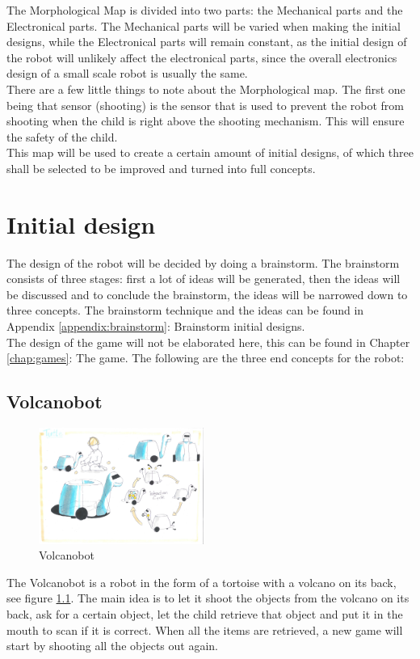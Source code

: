 \documentclass[11pt,twoside,a4paper]{report}
\begin{document}
The Morphological Map is divided into two parts: the Mechanical parts and the Electronical parts. The Mechanical parts will be varied when making the initial designs, while the Electronical parts will remain constant, as the initial design of the robot will unlikely affect the electronical parts, since the overall electronics design of a small scale robot is usually the same. \\
There are a few little things to note about the Morphological map. The first one being that sensor (shooting) is the sensor that is used to prevent the robot from shooting when the child is right above the shooting mechanism. This will ensure the safety of the child. \\
This map will be used to create a certain amount of initial designs, of which three shall be selected to be improved and turned into full concepts.
\label{chap:morphological}

\chapter{Initial design}
The design of the robot will be decided by doing a brainstorm. The brainstorm consists of three stages: first a lot of ideas will be generated, then the ideas will be discussed and to conclude the brainstorm, the ideas will be narrowed down to three concepts. The brainstorm technique and the ideas can be found in Appendix \ref{appendix:brainstorm}: Brainstorm initial designs. \\
The design of the game will not be elaborated here, this can be found in Chapter \ref{chap:games}: The game. The following are the three end concepts for the robot:

\section{Volcanobot}
\begin{figure}
  \begin{center}
    \includegraphics[width=0.48\textwidth]{Images/VolcanoBotConcept.pdf}
  \end{center}
  \caption{Volcanobot}
  \label{figure:volcanobot}
\end{figure}
The Volcanobot is a robot in the form of a tortoise with a volcano on its back, see figure \ref{figure:volcanobot}. The main idea is to let it shoot the objects from the volcano on its back, ask for a certain object, let the child retrieve that object and put it in the mouth to scan if it is correct. When all the items are retrieved, a new game will start by shooting all the objects out again.
\end{document}
